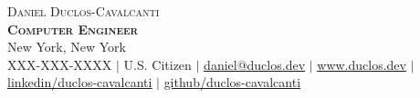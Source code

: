 \documentclass[letterpaper,11pt]{article}
\begin{document}

\begin{center}
    {\Huge \scshape Daniel Duclos-Cavalcanti} \\ \vspace{1pt}
    \textbf{\large{\scshape Computer Engineer}} \\ \vspace{1pt}
    New York, New York \\ \vspace{1pt}
    \small 
    XXX-XXX-XXXX 
    $|$ U.S. Citizen $|$
    \href{mailto:daniel@duclos.dev}{\underline{daniel@duclos.dev}} $|$ 
    \href{https://www.duclos.dev}{\underline{www.duclos.dev}} $|$
    \href{https://www.linkedin.com/in/duclos-cavalcanti/}{\underline{linkedin/duclos-cavalcanti}} $|$
    \href{https://github.com/duclos-cavalcanti}{\underline{github/duclos-cavalcanti}} 
\end{center}


\vspace{-16pt}
\vspace{-4pt}
\end{document}
